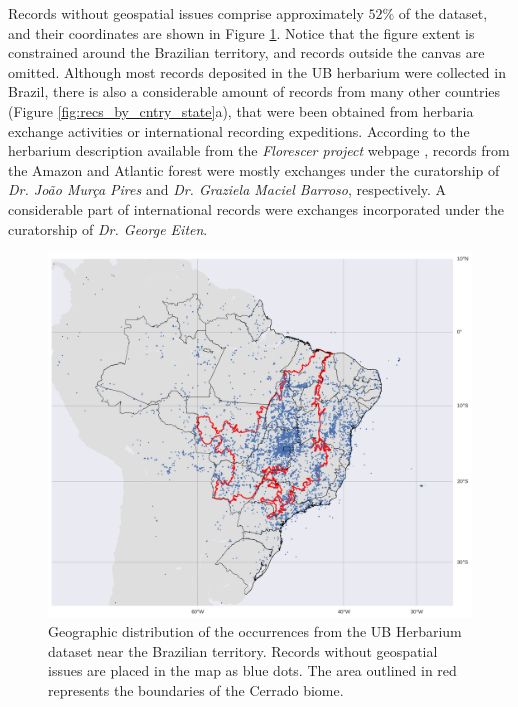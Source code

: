 Records without geospatial issues comprise approximately $52\%$ of the dataset, and their coordinates are shown in Figure \ref{fig:occurrence_map}. Notice that the figure extent is constrained around the Brazilian territory, and records outside the canvas are omitted. Although most records deposited in the UB herbarium were collected in Brazil, there is also a considerable amount of records from many other countries (Figure \ref{fig:recs_by_cntry_state}a), that were been obtained from herbaria exchange activities or international recording expeditions. According to the herbarium description available from the \textit{Florescer project} webpage \cite{florescer}, records from the Amazon and Atlantic forest were mostly exchanges under the curatorship of \textit{Dr. João Murça Pires} and \textit{Dr. Graziela Maciel Barroso}, respectively. A considerable part of international records were exchanges incorporated under the curatorship of \textit{Dr. George Eiten}.  


  \begin{figure}[!htb]
  	\centering
    \includegraphics[width=\linewidth]{figures/occurrence_map.png}
    \caption{Geographic distribution of the occurrences from the UB Herbarium dataset near the Brazilian territory. Records without geospatial issues are placed in the map as blue dots. The area outlined in red represents the boundaries of the Cerrado biome.}
    \label{fig:occurrence_map}
  \end{figure}
  
